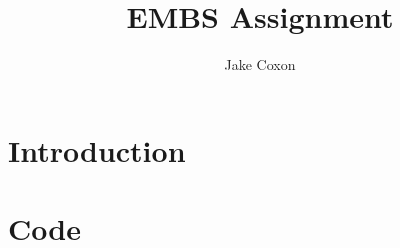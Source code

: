 \documentclass{report}
\begin{document}
\title{EMBS Assignment}
\author{Jake Coxon}
\maketitle

\tableofcontents

\section{Introduction}

\section{Code}


\end{document}
